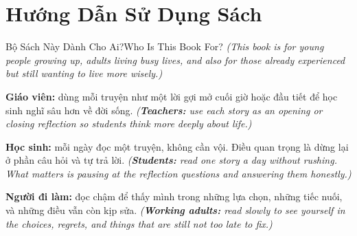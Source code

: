 \chapter*{Hướng Dẫn Sử Dụng Sách}

\begin{truyen}{Bộ Sách Này Dành Cho Ai?}{Who Is This Book For?}
\textit{(This book is for young people growing up, adults living busy lives, and also for those already experienced but still wanting to live more wisely.)}

\textbf{Giáo viên:} dùng mỗi truyện như một lời gợi mở cuối giờ hoặc đầu tiết để học sinh nghĩ sâu hơn về đời sống.
\textit{(\textbf{Teachers:} use each story as an opening or closing reflection so students think more deeply about life.)}

\textbf{Học sinh:} mỗi ngày đọc một truyện, không cần vội. Điều quan trọng là dừng lại ở phần câu hỏi và tự trả lời.
\textit{(\textbf{Students:} read one story a day without rushing. What matters is pausing at the reflection questions and answering them honestly.)}

\textbf{Người đi làm:} đọc chậm để thấy mình trong những lựa chọn, những tiếc nuối, và những điều vẫn còn kịp sửa.
\textit{(\textbf{Working adults:} read slowly to see yourself in the choices, regrets, and things that are still not too late to fix.)}
\end{truyen}

